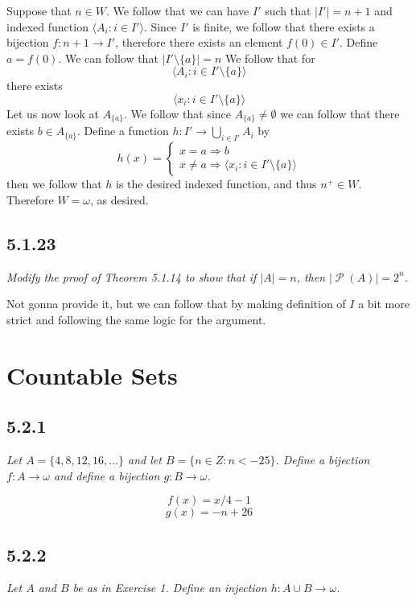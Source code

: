 \documentclass[11pt,oneside,titlepage]{book}
\DeclareMathOperator \pow {\mathcal {P}}
\DeclareMathOperator \ra {\Rightarrow}
\newcommand{\eangle}[1]{\langle #1 \rangle}
\begin{document}
Suppose that $n \in W$. We follow that we can have  $I'$ such that
$|I'| = n + 1$ and indexed function $\eangle{A_i: i \in I'}$. Since $I'$ is finite, we follow that
there exists a bijection $f: n + 1 \to I'$, therefore there exists an element $f(0) \in I'$.
Define $a = f(0)$. We can follow that $|I' \setminus \{a\}| = n$ We follow that for
$$\eangle{A_i: i \in I' \setminus \{a\}}$$
there exists
$$\eangle{x_i: i \in I' \setminus \{a\}}$$
Let us now look at $A_{\{a\}}$. We follow that since $A_{\{a\}} \neq \emptyset$ we can follow that
there exists $b \in A_{\{a\}}$. Define a function $h: I' \to \bigcup_{i \in I'}{A_i}$ by
$$h(x) = 
\begin{cases}
  x = a \ra b \\
  x \neq a \ra \eangle{x_i: i \in I' \setminus \{a\}}
\end{cases}
$$
then we follow that $h$ is the desired indexed function, and thus $n^+ \in W$. Therefore
$W = \omega$, as desired.

\subsection*{5.1.23}

\textit{Modify the proof of Theorem 5.1.14 to show that if $|A| = n$, then $|\pow(A)| = 2^n$.}

Not gonna provide it, but we can follow that by making definition of $I$ a bit more strict and
following the same logic for the argument.

\section{Countable Sets}

\subsection*{5.2.1}

\textit{Let $A = \{4, 8, 12, 16, ...\}$ and let $B = \{n \in Z: n < -25\}$. Define a bijection
  $f: A \to \omega$ and define a bijection $g: B \to \omega$.}

$$f(x) = x/4 - 1$$
$$g(x) = -n + 26$$

\subsection*{5.2.2}

\textit{Let $A$ and $B$ be as in Exercise 1. Define an injection $h: A \cup B \to \omega$.}
\end{document}
